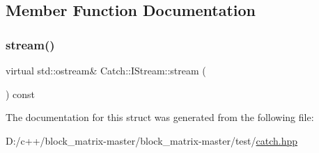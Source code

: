 \subsection{Member Function Documentation}
\mbox{\label{struct_catch_1_1_i_stream_a55a9ddbe250261ff38642f480ebdd902}} 
\subsubsection{\texorpdfstring{stream()}{stream()}}
{\footnotesize\ttfamily virtual std\+::ostream\& Catch\+::\+I\+Stream\+::stream (\begin{DoxyParamCaption}{ }\end{DoxyParamCaption}) const\hspace{0.3cm}{\ttfamily [pure virtual]}}



The documentation for this struct was generated from the following file\+:\begin{DoxyCompactItemize}
\item 
D\+:/c++/block\+\_\+matrix-\/master/block\+\_\+matrix-\/master/test/\mbox{\hyperlink{catch_8hpp}{catch.\+hpp}}\end{DoxyCompactItemize}
